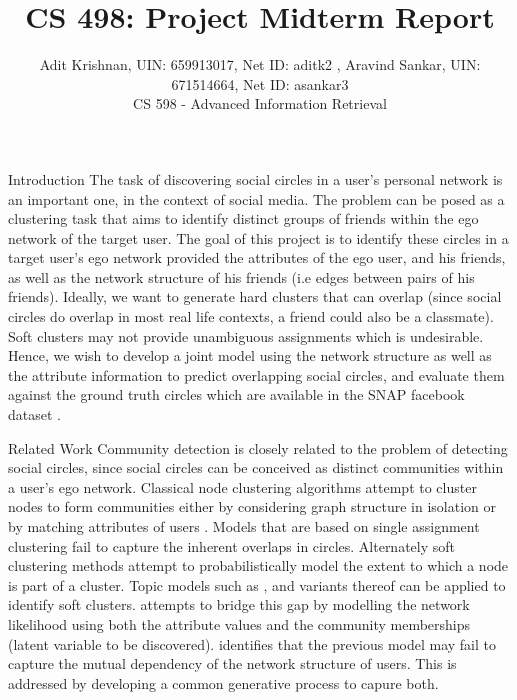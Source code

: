 \documentclass[11pt]{article}
\begin{document}
 
 
 
\title{CS 498: Project Midterm Report}%
\author{Adit Krishnan, UIN: 659913017, Net ID: aditk2 , Aravind Sankar, UIN: 671514664, Net ID: asankar3 \\
CS 598 - Advanced Information Retrieval} %
\maketitle
\begin{section}{Introduction}
The task of discovering social circles in a user's personal network is an important one, in the context of social media. The problem can be posed as a clustering task that aims to identify distinct groups of friends within the ego network of the target user. The goal of this project is to identify these circles in a target user's ego network provided the attributes of the ego user, and his friends, as well as the network structure of his friends (i.e edges between pairs of his friends). Ideally, we want to generate hard clusters that can overlap (since social circles do overlap in most real life contexts, a friend could also be a classmate). Soft clusters may not provide unambiguous assignments which is undesirable. Hence, we wish to develop a joint model using the network structure as well as the attribute information to predict overlapping social circles, and evaluate them against the ground truth circles which are available in the SNAP facebook dataset \cite{facebook dataset}.
\end{section}
\begin{section}{Related Work}
Community detection is closely related to the problem of detecting social circles, since social circles can be conceived as distinct communities within a user's ego network. Classical node clustering algorithms attempt to cluster nodes to form communities either by considering graph structure in isolation or by matching attributes of users \cite{johnson}. Models that are based on single assignment clustering \cite{l1,l2} fail to capture the inherent overlaps in circles. Alternately soft clustering methods attempt to probabilistically model the extent to which a node is part of a cluster. Topic models such as \cite{plsa}, \cite{lda} and variants thereof can be applied to identify soft clusters. \cite{facebook dataset} attempts to bridge this gap by modelling the network likelihood using both the attribute values and the community memberships (latent variable to be discovered).\cite{cesna} identifies that the previous model may fail to capture the mutual dependency of the network structure of users. This is addressed by developing a common generative process to capure both. 
\end{section}
\end{document}

